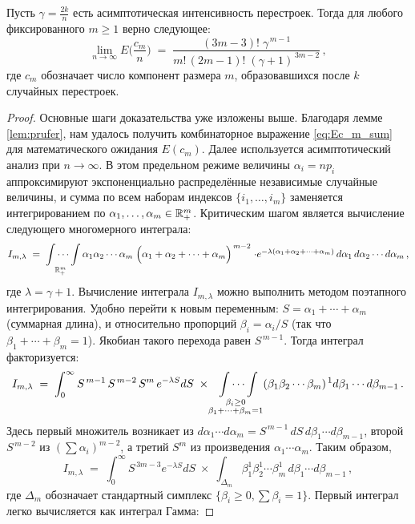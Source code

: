 \begin{theorem}\label{thm:cm_expectation}
Пусть $\gamma = \frac{2k}{n}$ есть асимптотическая интенсивность перестроек. Тогда для любого фиксированного $m \ge 1$ верно следующее: 
\[
\lim_{n \to \infty} E\!\Big(\frac{c_m}{n}\Big) \;=\; \frac{(3m-3)!\; \gamma^{\,m-1}}{m!\, (2m-1)! \; (\gamma+1)^{\,3m-2}}\,,
\] 
где $c_m$ обозначает число компонент размера $m$, образовавшихся после $k$ случайных перестроек. 
\end{theorem}

\begin{proof}
Основные шаги доказательства уже изложены выше. Благодаря лемме \ref{lem:prufer}, нам удалось получить комбинаторное выражение \eqref{eq:Ec_m_sum} для математического ожидания $E(c_m)$. Далее используется асимптотический анализ при $n \to \infty$. В этом предельном режиме величины $\alpha_i = n p_i$ аппроксимируют экспоненциально распределённые независимые случайные величины, и сумма по всем наборам индексов $\{i_1,\dots,i_m\}$ заменяется интегрированием по $\alpha_1,\dots,\alpha_m \in \mathbb{R}_+^m$. 
Критическим шагом является вычисление следующего многомерного интеграла:
\[
I_{m,\lambda} \;=\; \idotsint\limits_{\mathbb{R}^m_+} \alpha_1 \alpha_2 \cdots \alpha_m \;\Big(\alpha_1 + \alpha_2 + \cdots + \alpha_m\Big)^{\,m-2}\; \cdot $$ $$  e^{-\lambda(\alpha_1 + \alpha_2 + \cdots + \alpha_m)}\, d\alpha_1\,d\alpha_2 \cdots d\alpha_m\,,
\] 
где $\lambda = \gamma+1$. Вычисление интеграла $I_{m,\lambda}$ можно выполнить методом поэтапного интегрирования. Удобно перейти к новым переменным: $S = \alpha_1 + \cdots + \alpha_m$ (суммарная длина), и относительно пропорций $\beta_i = \alpha_i / S$ (так что $\beta_1+\cdots+\beta_m = 1$). Якобиан такого перехода равен $S^{\,m-1}$. Тогда интеграл факторизуется:
\[
I_{m,\lambda} \;=\; \int_{0}^{\infty} S^{\,m-1} \, S^{\,m-2} \, S^m \, e^{-\lambda S} dS \;\times\; \idotsint\limits_{\substack{\beta_i \ge 0\\ \beta_1+\cdots+\beta_m=1}} (\beta_1 \beta_2 \cdots \beta_m)^{\,1} d\beta_1 \cdots d\beta_{m-1}\,.
\] 
Здесь первый множитель возникает из $d\alpha_1\cdots d\alpha_m = S^{\,m-1}\, dS\, d\beta_1 \cdots d\beta_{m-1}$, второй $S^{\,m-2}$ из $(\sum \alpha_i)^{m-2}$, а третий $S^m$ из произведения $\alpha_1 \cdots \alpha_m$. Таким образом, 
\[
I_{m,\lambda} \;=\; \int_{0}^{\infty} S^{\,3m-3} e^{-\lambda S} dS \;\times\; \int_{\Delta_{m}} \beta_1^1 \beta_2^1 \cdots \beta_m^1 \, d\beta_1\cdots d\beta_{m-1}\,,
\] 
где $\Delta_{m}$ обозначает стандартный симплекс $\{\beta_i \ge 0, \sum \beta_i = 1\}$. Первый интеграл легко вычисляется как интеграл Гамма: 

\end{proof}
